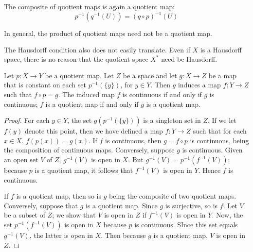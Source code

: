 \documentclass[12pt, a4paper, oneside, openright, titlepage]{book}
\begin{document}
\begin{rmk}
    The composite of quotient maps is again a quotient map: \begin{equation*}
        p^{-1}(q^{-1}(U)) = (q\circ p)^{-1}(U)
    \end{equation*}
\end{rmk}

In general, the product of quotient maps need not be a quotient map.

\begin{rmk}
    The Hausdorff condition also does not easily translate. Even if $X$ is a Hausdorff space, there is no reason that the quotient space $X^*$ need be Hausdorff.
\end{rmk}


\begin{thm}
    Let $p:X\rightarrow Y$ be a quotient map. Let $Z$ be a space and let $g:X\rightarrow Z$ be a map that is constant on each set $p^{-1}(\{y\})$, for $y \in Y$. Then $g$ induces a map $f:Y\rightarrow Z$ such that $f\circ p = g$. The induced map $f$ is continuous if and only if $g$ is continuous; $f$ is a quotient map if and only if $g$ is a quotient map.
    \begin{center}
    \end{center}
\end{thm}
\begin{proof}
    For each $y \in Y$, the set $g(p^{-1}(\{y\}))$ is a singleton set in $Z$. If we let $f(y)$ denote this point, then we have defined a map $f:Y\rightarrow Z$ such that for each $x \in X$, $f(p(x)) = g(x)$. If $f$ is continuous, then $g = f\circ p$ is continuous, being the composition of continuous maps. Conversely, suppose $g$ is continuous. Given an open set $V$ of $Z$, $g^{-1}(V)$ is open in $X$. But $g^{-1}(V) = p^{-1}(f^{-1}(V))$; because $p$ is a quotient map, it follows that $f^{-1}(V)$ is open in $Y$. Hence $f$ is continuous.

    If $f$ is a quotient map, then so is $g$ being the composite of two quotient maps. Conversely, suppose that $g$ is a quotient map. Since $g$ is surjective, so is $f$. Let $V$ be a subset of $Z$; we show that $V$ is open in $Z$ if $f^{-1}(V)$ is open in $Y$. Now, the set $p^{-1}(f^{-1}(V))$ is open in $X$ because $p$ is continuous. SInce this set equals $g^{-1}(V)$, the latter is open in $X$. Then because $g$ is a quotient map, $V$ is open in $Z$.
\end{proof}
\end{document}
